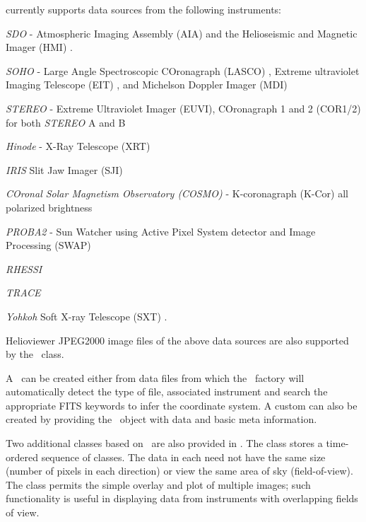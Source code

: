 \Map currently supports data sources from the following instruments:
\begin{inparaitem}
\item \textit{SDO} - Atmospheric Imaging Assembly (AIA) \citep{lemen2011atmospheric} and the Helioseismic and Magnetic Imager (HMI) \citep{scherrer2012helioseismic}.
\item \textit{SOHO} - Large Angle Spectroscopic COronagraph (LASCO) \citep{brueckner1995large}, Extreme ultraviolet Imaging Telescope (EIT) \citep{delaboudiniere1995eit}, and Michelson Doppler Imager (MDI) \citep{scherrer1995solar}
\item \textit{STEREO} - Extreme Ultraviolet Imager (EUVI), COronagraph 1 and 2 (COR1/2) for both \textit{STEREO} A and B \citep{howard2008sun}
\item \textit{Hinode} - X-Ray Telescope (XRT) \citep{golub2008x}
\item \textit{IRIS} Slit Jaw Imager (SJI) \citep{DePontieu2014}
\item \textit{COronal Solar Magnetism Observatory (COSMO)} -  K-coronagraph (K-Cor) all polarized brightness
\item \textit{PROBA2} - Sun Watcher using Active Pixel System detector and Image Processing (SWAP) \citep{seaton2013swap}
\item \textit{RHESSI} \citep{lin2002reuven}
\item \textit{TRACE}
\item \textit{Yohkoh} Soft X-ray Telescope (SXT) \citep{tsuneta1991soft}.
\end{inparaitem}
Helioviewer JPEG2000 image files of the above data sources are also supported by the \Map\ class.

A \Map\ can be created either from data files from which the \Map\ factory will automatically detect the type of file, associated instrument and search the appropriate FITS keywords to infer the coordinate system. 
A custom \GenericMap can also be created by providing the \Map\ object with data and basic meta information.

Two additional classes based on \Map\ are also provided in \sunpypkg.
The  class stores a time-ordered sequence of \Map classes.
The data in each \Map need not have the same size (number of pixels in each direction) or view the same area of sky (field-of-view).
The  class permits the simple overlay and plot of multiple \Map images; such functionality is useful in displaying data from instruments with overlapping fields of view.
